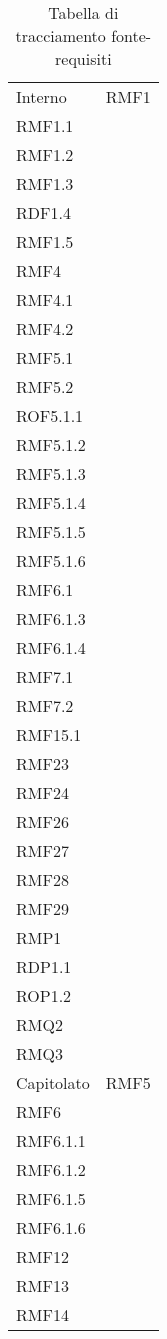 \setlength{\tabcolsep}{10pt}
\begin{longtable}[h!] { >{\centering}m{5cm} >{\centering}m{5cm} }
	\caption{Tabella di tracciamento fonte-requisiti} \\
	\rowcolor{lightgray}
	\thead{Fonte} & \thead{Requisiti} \\ \endhead%


	 Interno & RMF1 \\
	 RMF1.1 \\
	 RMF1.2 \\
	 RMF1.3 \\
	 RDF1.4 \\
	 RMF1.5 \\
	 RMF4 \\
	 RMF4.1 \\
	 RMF4.2 \\
	 RMF5.1 \\
	 RMF5.2 \\
	 ROF5.1.1 \\
	 RMF5.1.2 \\
	 RMF5.1.3 \\
	 RMF5.1.4 \\
	 RMF5.1.5 \\
	 RMF5.1.6 \\
	 RMF6.1 \\
	 RMF6.1.3 \\
	 RMF6.1.4 \\
	 RMF7.1 \\
	 RMF7.2 \\
	 RMF15.1 \\
	 RMF23 \\
	 RMF24 \\
	 RMF26 \\
	 RMF27 \\
	 RMF28 \\
	 RMF29 \\
	 RMP1 \\
	 RDP1.1 \\
	 ROP1.2 \\
	 RMQ2 \\
	 RMQ3
	 \tabularnewline
	 Capitolato & RMF5 \\
	 RMF6 \\
	 RMF6.1.1\\
	 RMF6.1.2 \\
	 RMF6.1.5 \\
	 RMF6.1.6 \\
	 RMF12 \\
	 RMF13 \\
	 RMF14 \\

\end{longtable}
